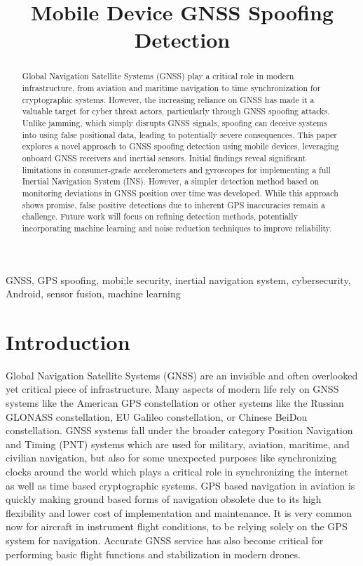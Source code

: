 \documentclass[conference]{IEEEtran}
\title{Mobile Device GNSS Spoofing Detection}
\author{
 \IEEEauthorblockN{Nathan Johnson}
 \IEEEauthorblockA{
    Embry-Riddle Aeronautical University\\
    Prescott, Arizona, USA\\
    johnsn63@my.erau.edu
  }
}
\begin{document}
\maketitle

\begin{abstract}
Global Navigation Satellite Systems (GNSS) play a critical role in modern infrastructure, from aviation and maritime navigation to time synchronization for cryptographic systems. However, the increasing reliance on GNSS has made it a valuable target for cyber threat actors, particularly through GNSS spoofing attacks. Unlike jamming, which simply disrupts GNSS signals, spoofing can deceive systems into using false positional data, leading to potentially severe consequences. This paper explores a novel approach to GNSS spoofing detection using mobile devices, leveraging onboard GNSS receivers and inertial sensors. Initial findings reveal significant limitations in consumer-grade accelerometers and gyroscopes for implementing a full Inertial Navigation System (INS). However, a simpler detection method based on monitoring deviations in GNSS position over time was developed. While this approach shows promise, false positive detections due to inherent GPS inaccuracies remain a challenge. Future work will focus on refining detection methods, potentially incorporating machine learning and noise reduction techniques to improve reliability.
\end{abstract}

\begin{IEEEkeywords}
GNSS, GPS spoofing, mobi;le security, inertial navigation system, cybersecurity, Android, sensor fusion, machine learning
\end{IEEEkeywords}
  

\section{Introduction}
Global Navigation Satellite Systems (GNSS) are an invisible and often overlooked yet critical piece of infrastructure. Many aspects of modern life rely on GNSS systems like the American GPS constellation or other systems like the Russian GLONASS constellation, EU Galileo constellation, or Chinese BeiDou constellation. GNSS systems fall under the broader category Position Navigation and Timing (PNT) systems which are used for military, aviation, maritime, and civilian navigation, but also for some unexpected purposes like synchronizing clocks around the world which plays a critical role in synchronizing the internet as well as time based cryptographic systems\cite{lu2021}. GPS based navigation in aviation is quickly making ground based forms of navigation obsolete due to its high flexibility and lower cost of implementation and maintenance. It is very common now for aircraft in instrument flight conditions, to be relying solely on the GPS system for navigation. Accurate GNSS service has also become critical for performing basic flight functions and stabilization in modern drones\cite{meng2021}.
\end{document}
